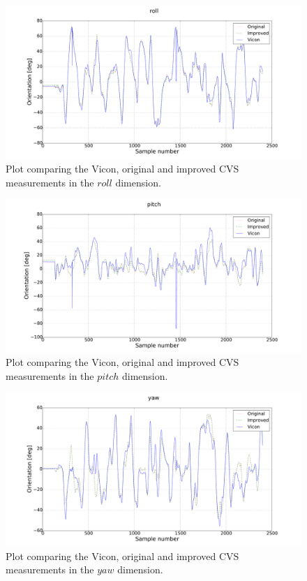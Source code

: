 \begin{figure}
  \centering
  \includegraphics[clip, trim = 100 0 140 0, width=\textwidth]{figures/chapter3/roll}
  \caption{Plot comparing the Vicon, original and improved CVS measurements in the $roll$ dimension.}
\end{figure}
\begin{figure}
  \centering
  \includegraphics[clip, trim = 100 0 140 0, width=\textwidth]{figures/chapter3/pitch}
  \caption{Plot comparing the Vicon, original and improved CVS measurements in the $pitch$ dimension.}
\end{figure}
\begin{figure}
  \centering
  \includegraphics[clip, trim = 100 0 140 0, width=\textwidth]{figures/chapter3/yaw}
  \caption{Plot comparing the Vicon, original and improved CVS measurements in the $yaw$ dimension.}
  \label{fig:estimate-yaw}
\end{figure}

